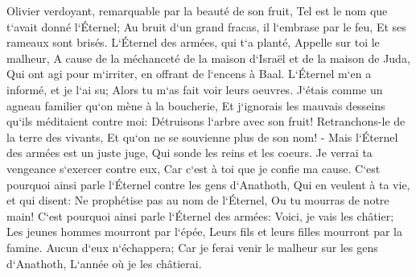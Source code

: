 \verse Olivier verdoyant, remarquable par la beauté de son fruit, Tel est le nom que t`avait donné l`Éternel; Au bruit d`un grand fracas, il l`embrase par le feu, Et ses rameaux sont brisés. 
\verse L`Éternel des armées, qui t`a planté, Appelle sur toi le malheur, A cause de la méchanceté de la maison d`Israël et de la maison de Juda, Qui ont agi pour m`irriter, en offrant de l`encens à Baal. 
\verse L`Éternel m`en a informé, et je l`ai su; Alors tu m`as fait voir leurs oeuvres. 
\verse J`étais comme un agneau familier qu`on mène à la boucherie, Et j`ignorais les mauvais desseins qu`ils méditaient contre moi: Détruisons l`arbre avec son fruit! Retranchons-le de la terre des vivants, Et qu`on ne se souvienne plus de son nom! - 
\verse Mais l`Éternel des armées est un juste juge, Qui sonde les reins et les coeurs. Je verrai ta vengeance s`exercer contre eux, Car c`est à toi que je confie ma cause. 
\verse C`est pourquoi ainsi parle l`Éternel contre les gens d`Anathoth, Qui en veulent à ta vie, et qui disent: Ne prophétise pas au nom de l`Éternel, Ou tu mourras de notre main! 
\verse C`est pourquoi ainsi parle l`Éternel des armées: Voici, je vais les châtier; Les jeunes hommes mourront par l`épée, Leurs fils et leurs filles mourront par la famine. 
\verse Aucun d`eux n`échappera; Car je ferai venir le malheur sur les gens d`Anathoth, L`année où je les châtierai. 


